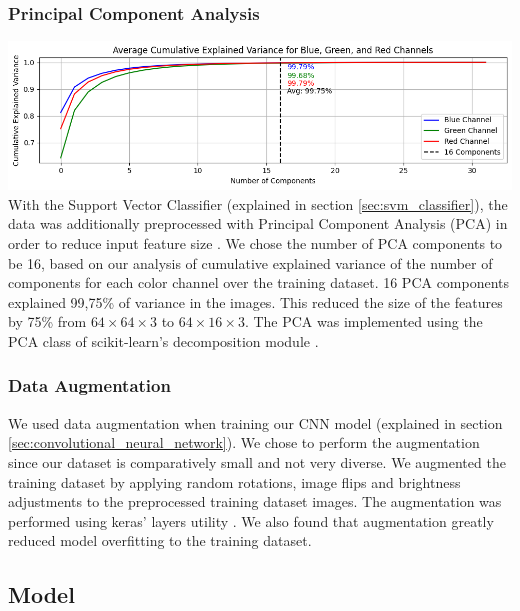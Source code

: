\documentclass{article}
\begin{document}
\subsubsection*{Principal Component Analysis}
\label{sec:principal_component_analysis}
\includegraphics[width=\textwidth]{images/pca_cumulative_variance.png}
With the Support Vector Classifier (explained in section \ref{sec:svm_classifier}), the data was additionally preprocessed with Principal Component Analysis (PCA) in order to reduce input feature size \cite{woldPrincipalComponentAnalysis}. We chose the number of PCA components to be 16, based on our analysis of cumulative explained variance of the number of components for each color channel over the training dataset. 16 PCA components explained 99,75\% of variance in the images. This reduced the size of the features by 75\% from $64\times64\times3$ to $64\times16\times3$. The PCA was implemented using the PCA class of scikit-learn’s decomposition module \cite{PCA}.

\subsubsection*{Data Augmentation}
\label{sec:data_augmentation}
We used data augmentation when training our CNN model (explained in section \ref{sec:convolutional_neural_network}). We chose to perform the augmentation since our dataset is comparatively small and not very diverse. We augmented the training dataset by applying random rotations, image flips and brightness adjustments to the preprocessed training dataset images. The augmentation was performed using keras' layers utility \cite{ModuleTfkeraslayersTensorFlow}. We also found that augmentation greatly reduced model overfitting to the training dataset.

\subsection{Model}
\label{sec:model}
\end{document}
